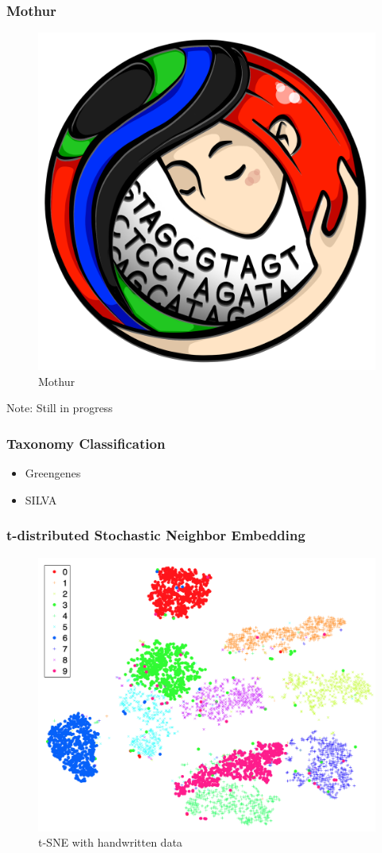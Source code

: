 \documentclass{beamer}
\begin{document}
    \begin{frame}
        \frametitle{Mothur}

        \begin{figure}[h!]
            \includegraphics[width=0.3 \linewidth]{figures/mothur.png}
            \caption{Mothur}
        \end{figure}

        Note: Still in progress
    \end{frame}

    \begin{frame}
        \frametitle{Taxonomy Classification}

        \begin{itemize}
            \item Greengenes \cite{greengenes1}
            \item SILVA \cite{silva1, silva2}
        \end{itemize}
    \end{frame}

    \begin{frame}
        \frametitle[t-SNE]{t-distributed Stochastic Neighbor Embedding}

        \begin{figure}[h!]
            \includegraphics[width=0.6 \linewidth]{figures/tsne.png}
            \caption{t-SNE with handwritten data \protect \cite{tsne1}}
        \end{figure}
    \end{frame}
\end{document}
